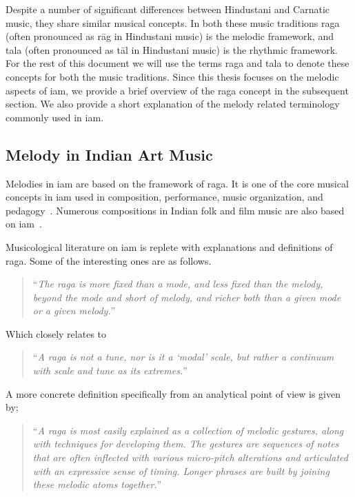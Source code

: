 Despite a number of significant differences between Hindustani and Carnatic music, they share similar musical concepts. In both these music traditions \gls{raga} (often pronounced as r\={a}g in Hindustani music) is the melodic framework, and \gls{tala} (often pronounced as t\={a}l in Hindustani music) is the rhythmic framework. For the rest of this document we will use the terms \gls{raga} and \gls{tala} to denote these concepts for both the music traditions. Since this thesis focuses on the melodic aspects of \gls{iam}, we provide a brief overview of the \gls{raga} concept in the subsequent section. We also provide a short explanation of the melody related terminology commonly used in \gls{iam}. 


\subsection{Melody in Indian Art Music}
\label{sec:melody_in_iam}

Melodies in \gls{iam} are based on the framework of \gls{raga}. It is one of the core musical concepts in \gls{iam} used in composition, performance, music organization, and pedagogy~\citep{Bagchee1998,Danielou2010}. Numerous compositions in Indian folk and film music are also based on \gls{iam}~\citep{ganti2013bollywood}.

Musicological literature on \gls{iam} is replete with explanations and definitions of \gls{raga}. Some of the interesting ones are as follows.

\blockcquote[p. 96]{martinez2001semiosis}{``\textit{The \gls{raga} is more fixed than a mode, and less fixed than the melody, beyond the mode and short of melody, and richer both than a given mode or a given melody.}''}

Which closely relates to

\blockcquote[]{powers1963background}{``\textit{A \gls{raga} is not a tune, nor is it a `modal' scale, but rather a continuum with scale and tune as its extremes.}''}

A more concrete definition specifically from an analytical point of view is given by;

\blockcquote[]{chordia2013joint}{``\textit{A \gls{raga} is most easily explained as a collection of melodic gestures, along with techniques for developing them. The gestures are sequences of notes that are often inflected with various micro-pitch alterations and articulated with an expressive sense of timing. Longer phrases are built by joining these melodic atoms together.}''}

